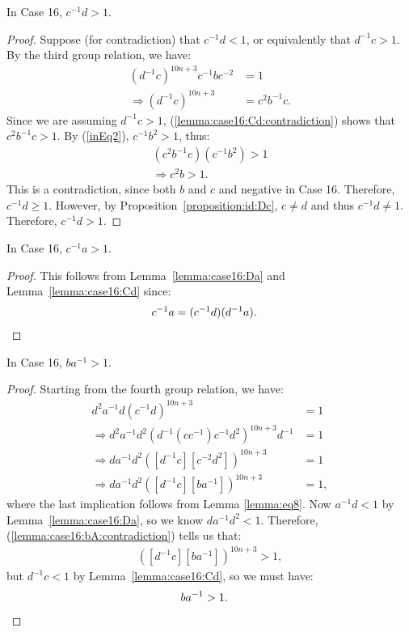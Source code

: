 \begin{lemma} In Case 16, $c^{-1}d>1$.
\label{lemma:case16:Cd}
\end{lemma}
\begin{proof} Suppose (for contradiction) that $c^{-1}d<1$, or equivalently that $d^{-1}c>1$. By the third group relation, we have:
\begin{align}
(d^{-1}c)^{10n+3}c^{-1}bc^{-2}&=1\nonumber{}\\
\Rightarrow{}(d^{-1}c)^{10n+3}&=c^{2}b^{-1}c.\label{lemma:case16:Cd:contradiction}
\end{align}
Since we are assuming $d^{-1}c>1$, (\ref{lemma:case16:Cd:contradiction}) shows that $c^{2}b^{-1}c>1$. By (\ref{inEq2}), $c^{-1}b^{2}>1$, thus:
\begin{align*}
(c^{2}b^{-1}c)(c^{-1}b^{2})>1\\
\Rightarrow{}c^{2}b>1.
\end{align*}
This is a contradiction, since both $b$ and $c$ and negative in Case 16. Therefore, $c^{-1}d\geq{}1$. However, by Proposition~\ref{proposition:id:Dc}, $c\neq{}d$ and thus $c^{-1}d\neq{}1$. Therefore, $c^{-1}d>1$.
\end{proof}

\begin{corollary} In Case 16, $c^{-1}a>1$.
\label{lemma:case16:Ca}
\end{corollary}
\begin{proof}
This follows from Lemma~\ref{lemma:case16:Da} and Lemma~\ref{lemma:case16:Cd} since:
\begin{align*}
c^{-1}a&=(c^{-1}d)(d^{-1}a).\qedhere
\end{align*}
\end{proof}

\begin{lemma} In Case 16, $ba^{-1}>1$.
\label{lemma:case16:bA}
\end{lemma}
\begin{proof}
Starting from the fourth group relation, we have:
\begin{align}
d^{2}a^{-1}d(c^{-1}d)^{10n+3}&=1\nonumber{}\\
\Rightarrow{}d^{2}a^{-1}d^{2}(d^{-1}(cc^{-1})c^{-1}d^{2})^{10n+3}d^{-1}&=1\nonumber{}\\
\Rightarrow{}da^{-1}d^{2}([d^{-1}c][c^{-2}d^{2}])^{10n+3}&=1\nonumber{}\\
\Rightarrow{}da^{-1}d^{2}([d^{-1}c][ba^{-1}])^{10n+3}&=1,\label{lemma:case16:bA:contradiction}
\end{align}
where the last implication follows from Lemma \ref{lemma:eq8}. Now $a^{-1}d<1$ by Lemma~\ref{lemma:case16:Da}, so we know $da^{-1}d^{2}<1$. Therefore, (\ref{lemma:case16:bA:contradiction}) tells us that:
\begin{align*}
([d^{-1}c][ba^{-1}])^{10n+3}>1,
\end{align*}
but $d^{-1}c<1$ by Lemma~\ref{lemma:case16:Cd}, so we must have:
\begin{align*}
ba^{-1}&>1.\qedhere
\end{align*}
\end{proof}



